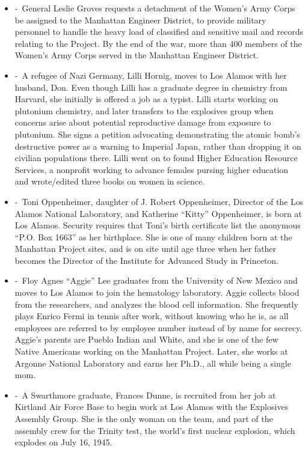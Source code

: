 \documentclass[12pt,a4paper]{article}
\begin{document}
\begin{enumerate}
\begin{itemize}
    \item[]  -\ General Leslie Groves requests a detachment of the Women's Army Corps be assigned to the Manhattan Engineer District, to provide military personnel to handle the heavy load of classified and sensitive mail and records relating to the Project. By the end of the war, more than 400 members of the Women's Army Corps served in the Manhattan Engineer District.
    \item[]  -\ A refugee of Nazi Germany, Lilli Hornig, moves to Los Alamos with her husband, Don. Even though Lilli has a graduate degree in chemistry from Harvard, she initially is offered a job as a typist. Lilli starts working on plutonium chemistry, and later transfers to the explosives group when concerns arise about potential reproductive damage from exposure to plutonium. She signs a petition advocating demonstrating the atomic bomb's destructive power as a warning to Imperial Japan, rather than dropping it on civilian populations there. Lilli went on to found Higher Education Resource Services, a nonprofit working to advance females pursing higher education and wrote/edited three books on women in science.
    \item[]  -\ Toni Oppenheimer, daughter of J. Robert Oppenheimer, Director of the Los Alamos National Laboratory, and Katherine ``Kitty'' Oppenheimer, is born at Los Alamos. Security requires that Toni's birth certificate list the anonymous ``P.O. Box 1663'' as her birthplace. She is one of many children born at the Manhattan Project sites, and is on site until age three when her father becomes the Director of the Institute for Advanced Study in Princeton.
    \item[]  -\ Floy Agnes ``Aggie'' Lee graduates from the University of New Mexico and moves to Los Alamos to join the hematology laboratory. Aggie collects blood from the researchers, and analyzes the blood cell information. She frequently plays Enrico Fermi in tennis after work, without knowing who he is, as all employees are referred to by employee number instead of by name for secrecy. Aggie's parents are Pueblo Indian and White, and she is one of the few Native Americans working on the Manhattan Project. Later, she works at Argonne National Laboratory and earns her Ph.D., all while being a single mom.
    \item[]  -\ A Swarthmore graduate, Frances Dunne, is recruited from her job at Kirtland Air Force Base to begin work at Los Alamos with the Explosives Assembly Group. She is the only woman on the team, and part of the assembly crew for the Trinity test, the world's first nuclear explosion, which explodes on July 16, 1945.

\end{itemize}
\end{enumerate}
\end{document}
